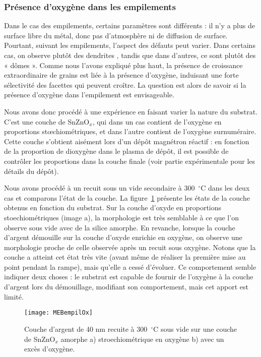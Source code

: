 {{	\subsubsection{Présence d'oxygène dans les empilements}
Dans le cas des empilements, certains paramètres sont différents : il n’y a plus de surface libre du métal, donc pas d’atmosphère ni de diffusion de surface. Pourtant, suivant les empilements, l’aspect des défauts peut varier. Dans certains cas, on observe plutôt des \og dendrites \fg, tandis que dans d’autres, ce sont plutôt des « dômes ». Comme nous l’avons expliqué plus haut, la présence de croissance extraordinaire de grains est liée à la présence d’oxygène, induisant une forte sélectivité des facettes qui peuvent croître. La question est alors de savoir si la présence d’oxygène dans l’empilement est envisageable.\par 
Nous avons donc procédé à une expérience en faisant varier la nature du substrat. C’est une couche de SnZnO$_x$, qui dans un cas contient de l’oxygène en proportions stœchiométriques, et dans l’autre contient de l’oxygène surnuméraire. Cette couche s’obtient aisément lors d’un dépôt magnétron réactif : en fonction de la proportion de dioxygène dans le plasma de dépôt, il est possible de contrôler les proportions dans la couche finale (voir partie expérimentale pour les détails du dépôt).\par 
Nous avons procédé à un recuit sous un vide secondaire à 300~$^\circ$C dans les deux cas et comparons l’état de la couche. La figure~\ref{MEBempilOx} présente les états de la couche obtenus en fonction du substrat. Sur la couche d’oxyde en proportions stoechiométriques (image a), la morphologie est très semblable à ce que l’on observe sous vide avec de la silice amorphe. En revanche, lorsque la couche d’argent démouille sur la couche d’oxyde enrichie en oxygène, on observe une morphologie proche de celle observée après un recuit sous oxygène. Notons que la couche a atteint cet état très vite (avant même de réaliser la première mise au point pendant la rampe), mais qu’elle a cessé d’évoluer. Ce comportement semble indiquer deux choses : le substrat est capable de fournir de l’oxygène à la couche d’argent lors du démouillage, modifiant son comportement, mais cet apport est limité.\par 
{}
\begin{figure}[!htb]
\centering
\texttt{[image: MEBempilOx]}
\caption{Couche d’argent de 40 nm recuite à 300~$^\circ$C sous vide sur une couche de SnZnO$_x$ amorphe a) stroechiométrique en oxygène b) avec un excès d'oxygène.}
\label{MEBempilOx}
\end{figure}
}}
